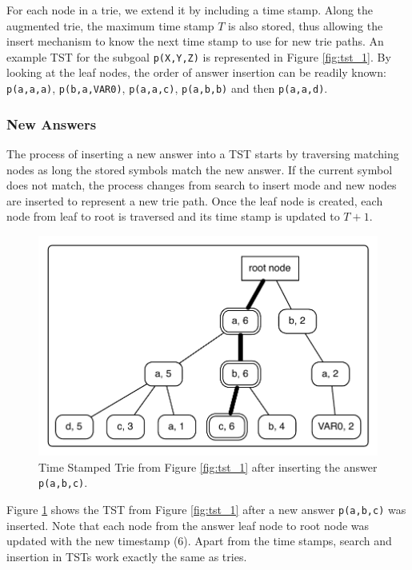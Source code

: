 For each node in a trie, we extend it by including a time stamp. Along the augmented trie, the maximum time stamp
$T$ is also stored, thus allowing the insert mechanism to know the next time stamp to use for new trie paths.
An example TST for the subgoal \texttt{p(X,Y,Z)} is represented in Figure \ref{fig:tst_1}.
By looking at the leaf nodes, the order of answer insertion
can be readily known: \texttt{p(a,a,a)}, \texttt{p(b,a,VAR0)}, \texttt{p(a,a,c)}, \texttt{p(a,b,b)} and then
\texttt{p(a,a,d)}.

\subsubsection{New Answers}

The process of inserting a new answer into a TST starts by traversing matching nodes as long the stored symbols
match the new answer. If the current symbol does not match, the process changes from search to insert mode and
new nodes are inserted to represent a new trie path. Once the leaf node is created, each node from leaf to root
is traversed and its time stamp is updated to $T + 1$.

\begin{figure}[ht]
  \centering
    \includegraphics[scale=0.6]{tst_2.pdf}
  \caption{Time Stamped Trie from Figure \ref{fig:tst_1} after inserting the answer \texttt{p(a,b,c)}.}
  \label{fig:tst_2}
\end{figure}

Figure \ref{fig:tst_2} shows the TST from Figure \ref{fig:tst_1} after a new answer \texttt{p(a,b,c)} was inserted.
Note that each node from the answer leaf node to root node was updated with the new timestamp (6). Apart from
the time stamps, search and insertion in TSTs work exactly the same as tries.

